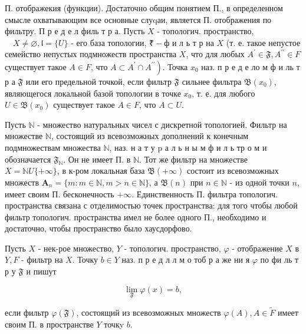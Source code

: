\documentclass[10pt]{article}
\begin{document}
П. отображекия (функции). Достаточно общим понятием П., в определенном смысле охватывающим все основные слуqаи, является П. отображения по фильтру. П р е д е л филь т р а. Пусть $X$ - топологич. пространство, $\quad X \neq \varnothing, \mathfrak{l}=\{U\}$ - его база топологии, $₹-ф$ и л ь т р на $X$ (т. е. такое непустое семейство непустых подмножеств пространства $X$, что для любых $A^{\prime} \in \mathfrak{F}, A^{\prime \prime} \in F$ существует такое $A \in F$, что $\left.A \subset A^{\prime} \cap A^{\prime \prime}\right)$. Точка $x_{0}$ наз. п р е д е ло м ф и ль т р а $\mathfrak{F}$ или его предельной точкой, если фильтр $\mathfrak{F}$ сильнее фильтра $\mathfrak{B}\left(x_{0}\right)$, являющегося локальной базой топологии в точке $x_{0}$, т. е. для любого $U \in \mathfrak{B}\left(x_{0}\right)$ существует такое $A \in F$, что $A \subset U$.



Пусть $\mathbb{N}$ - множество натуральных чисел с дискретной топологией. Фильтр на множестве $\mathbb{N}$, состоящий из всевозможных дополнений к конечным подмножествам множества $\mathbb{N}$, наз. н а т у $\mathrm{p}$ а л ь н ы м ф и л ь тр о м и обозначается $\mathfrak{F}_{\mathbb{N}}$. Он не имеет П. в $\mathbb{N}$. Тот же фильтр на множестве $X=\mathbb{N} U\{+\infty\}$, в к-ром локальная база $\mathfrak{B}(+\infty)$ состоит из всевозможных множеств $\boldsymbol{A}_{n}=\{m: m \in \mathbb{N}, m>n \in \mathbb{N}\}$, а $\mathfrak{B}(n)$ при $n \in \mathbb{N}$ - из одной точки $n$, имеет своим П. бесконечность $+\infty$. Единственность П. фильтра топологич. пространства связана с отделимостью точек пространства: для того чтобы любой фильтр топологич. пространства имел не более одного П., необходимо и достаточно, чтобы пространство было хаусдорфово.



Пусть $X$ - нек-рое множество, $Y$ - топологич. пространство, $\varphi$ - отображение $X$ в $Y, F$ - фильтр на $X$. Точку $b \in Y$ наз. п р е д л л м о тоб р а же ни я $\varphi$ по фи ль т р у $\mathfrak{F}$ и пишут



\[

\lim _{\mathfrak{F}} \varphi(x)=b,

\]



если фильтр $\varphi(\mathfrak{F})$, состоящий из всевозможных множеств $\varphi(A), A \in \widetilde{F}$ имеет своим П. в пространстве $Y$ точкy $b$.
\end{document}
